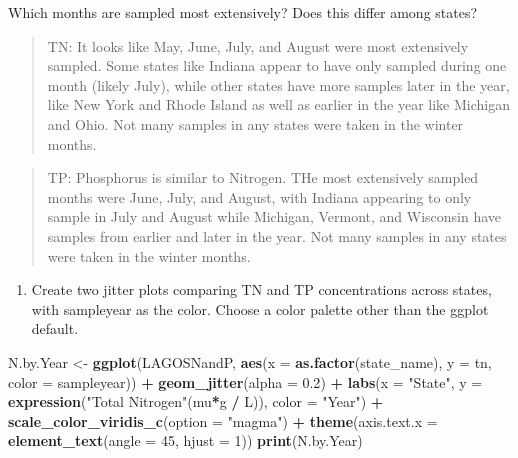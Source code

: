 \documentclass[]{article}
\newenvironment{Shaded}{\begin{snugshade}}{\end{snugshade}}
\newcommand{\DataTypeTok}[1]{\textcolor[rgb]{0.13,0.29,0.53}{#1}}
\newcommand{\DecValTok}[1]{\textcolor[rgb]{0.00,0.00,0.81}{#1}}
\newcommand{\FloatTok}[1]{\textcolor[rgb]{0.00,0.00,0.81}{#1}}
\newcommand{\KeywordTok}[1]{\textcolor[rgb]{0.13,0.29,0.53}{\textbf{#1}}}
\newcommand{\NormalTok}[1]{#1}
\newcommand{\OperatorTok}[1]{\textcolor[rgb]{0.81,0.36,0.00}{\textbf{#1}}}
\newcommand{\StringTok}[1]{\textcolor[rgb]{0.31,0.60,0.02}{#1}}
\providecommand{\tightlist}{%
  \setlength{\itemsep}{0pt}\setlength{\parskip}{0pt}}
\begin{document}
Which months are sampled most extensively? Does this differ among
states?

\begin{quote}
TN: It looks like May, June, July, and August were most extensively
sampled. Some states like Indiana appear to have only sampled during one
month (likely July), while other states have more samples later in the
year, like New York and Rhode Island as well as earlier in the year like
Michigan and Ohio. Not many samples in any states were taken in the
winter months.
\end{quote}

\begin{quote}
TP: Phosphorus is similar to Nitrogen. THe most extensively sampled
months were June, July, and August, with Indiana appearing to only
sample in July and August while Michigan, Vermont, and Wisconsin have
samples from earlier and later in the year. Not many samples in any
states were taken in the winter months.
\end{quote}

\begin{enumerate}
\def\labelenumi{\arabic{enumi}.}
\setcounter{enumi}{10}
\tightlist
\item
  Create two jitter plots comparing TN and TP concentrations across
  states, with sampleyear as the color. Choose a color palette other
  than the ggplot default.
\end{enumerate}

\begin{Shaded}
\begin{Highlighting}[]
\NormalTok{N.by.Year <-}\StringTok{  }
\KeywordTok{ggplot}\NormalTok{(LAGOSNandP, }
       \KeywordTok{aes}\NormalTok{(}\DataTypeTok{x =} \KeywordTok{as.factor}\NormalTok{(state_name), }\DataTypeTok{y =}\NormalTok{ tn, }\DataTypeTok{color =}\NormalTok{ sampleyear)) }\OperatorTok{+}
\StringTok{  }\KeywordTok{geom_jitter}\NormalTok{(}\DataTypeTok{alpha =} \FloatTok{0.2}\NormalTok{) }\OperatorTok{+}\StringTok{ }
\StringTok{  }\KeywordTok{labs}\NormalTok{(}\DataTypeTok{x =} \StringTok{"State"}\NormalTok{, }\DataTypeTok{y =} \KeywordTok{expression}\NormalTok{(}\StringTok{"Total Nitrogen"}\NormalTok{(mu}\OperatorTok{*}\NormalTok{g }\OperatorTok{/}\StringTok{ }\NormalTok{L)), }\DataTypeTok{color =} \StringTok{"Year"}\NormalTok{) }\OperatorTok{+}
\StringTok{  }\KeywordTok{scale_color_viridis_c}\NormalTok{(}\DataTypeTok{option =} \StringTok{"magma"}\NormalTok{) }\OperatorTok{+}
\StringTok{  }\KeywordTok{theme}\NormalTok{(}\DataTypeTok{axis.text.x =} \KeywordTok{element_text}\NormalTok{(}\DataTypeTok{angle =} \DecValTok{45}\NormalTok{, }\DataTypeTok{hjust =} \DecValTok{1}\NormalTok{))}
\KeywordTok{print}\NormalTok{(N.by.Year)}
\end{Highlighting}
\end{Shaded}
\end{document}
